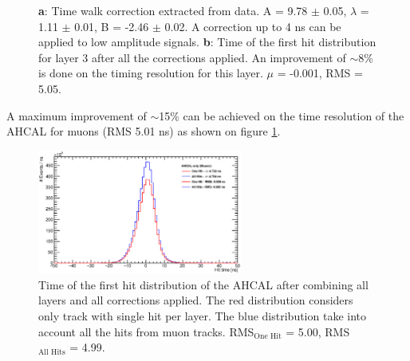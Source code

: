 \documentclass[twoside,a4paper,11pt]{article}
\begin{document}
\begin{figure}[htbp]
	\hfill
	\caption[]{\textbf{a}: Time walk correction extracted from data. A = 9.78 $\pm$ 0.05, $\lambda$ = 1.11 $\pm$ 0.01, B = -2.46 $\pm$ 0.02. A correction up to 4 ns can be applied to low amplitude signals. \textbf{b}: Time of the first hit distribution for layer 3 after all the corrections applied. An improvement of $\sim$8\% is done on the timing resolution for this layer. $\mu$ = -0.001, RMS = 5.05.}
\end{figure}
A maximum improvement of $\sim$15\% can be achieved on the time resolution of the AHCAL for muons (RMS 5.01 ns) as shown on figure \ref{fig:timing_muons}.
\begin{figure}[htbp]
\begin{center}
\includegraphics[width=0.6\textwidth]{fig/timing_muons.eps}
\caption{Time of the first hit distribution of the AHCAL after combining all layers and all corrections applied. The red distribution considers only track with single hit per layer. The blue distribution take into account all the hits from muon tracks. RMS$_{\text{One Hit}}$ = 5.00, RMS$_{\text{All Hits}}$ = 4.99.}
\label{fig:timing_muons}
\end{center}
\end{figure}
\end{document}
